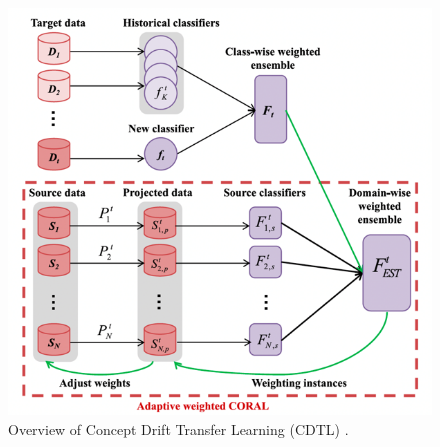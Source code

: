    \begin{figure}[!ht]    
        \begin{center}
            \includegraphics[width=.80\textwidth]{3_State-of-the-art/fig/cdtl.png} 
        \end{center}
        \caption{Overview of Concept Drift Transfer Learning (CDTL) \cite{sun2016return}.}
        \label{cdtl_fig}

        \end{figure}

